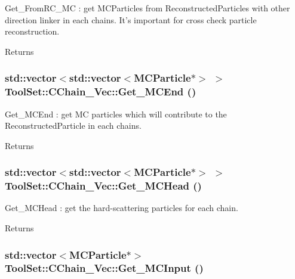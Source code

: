 Get\_\-FromRC\_\-MC : get MCParticles from ReconstructedParticles with other direction linker in each chains. It's important for cross check particle reconstruction.

\begin{DoxyReturn}{Returns}

\end{DoxyReturn}
\hypertarget{classToolSet_1_1CChain__Vec_ae16c3ae128fc1beec87fd41581339047}{
\subsubsection[{Get\_\-MCEnd}]{\setlength{\rightskip}{0pt plus 5cm}std::vector$<$std::vector$<$MCParticle$\ast$$>$ $>$ ToolSet::CChain\_\-Vec::Get\_\-MCEnd ()}}
\label{classToolSet_1_1CChain__Vec_ae16c3ae128fc1beec87fd41581339047}


Get\_\-MCEnd : get MC particles which will contribute to the ReconstructedParticle in each chains. \begin{DoxyReturn}{Returns}

\end{DoxyReturn}
\hypertarget{classToolSet_1_1CChain__Vec_a27f257b172bd9fd5447d71dd69b9faff}{
\subsubsection[{Get\_\-MCHead}]{\setlength{\rightskip}{0pt plus 5cm}std::vector$<$std::vector$<$MCParticle$\ast$$>$ $>$ ToolSet::CChain\_\-Vec::Get\_\-MCHead ()}}
\label{classToolSet_1_1CChain__Vec_a27f257b172bd9fd5447d71dd69b9faff}


Get\_\-MCHead : get the hard-\/scattering particles for each chain. \begin{DoxyReturn}{Returns}

\end{DoxyReturn}
\hypertarget{classToolSet_1_1CChain__Vec_aa9f1bcca5d3f17ae1319e96eb9fdd7c1}{
\subsubsection[{Get\_\-MCInput}]{\setlength{\rightskip}{0pt plus 5cm}std::vector$<$MCParticle$\ast$$>$ ToolSet::CChain\_\-Vec::Get\_\-MCInput ()}}
\label{classToolSet_1_1CChain__Vec_aa9f1bcca5d3f17ae1319e96eb9fdd7c1}


